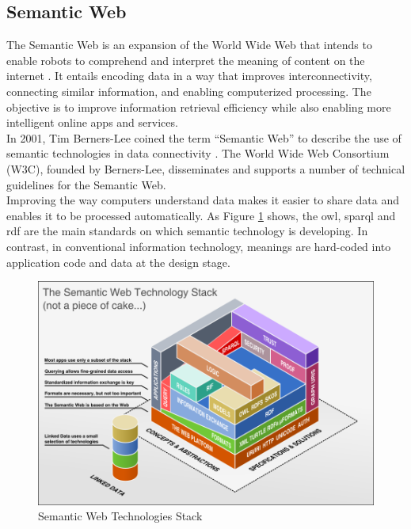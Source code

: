\subsection{Semantic Web\label{sec:semweb}}
The Semantic Web is an expansion of the World Wide Web that intends to enable robots to comprehend and interpret the meaning of content on the internet \cite{shadbolt2006semantic, berners2023semantic, kim2003semantic}. It entails encoding data in a way that improves interconnectivity, connecting similar information, and enabling computerized processing. The objective is to improve information retrieval efficiency while also enabling more intelligent online apps and services.\\

In 2001, Tim Berners-Lee coined the term “Semantic Web” to describe the use of semantic technologies in data connectivity \cite{berners2023semantic}. The World Wide Web Consortium (W3C), founded by Berners-Lee, disseminates and supports a number of technical guidelines for the Semantic Web.\\

Improving the way computers understand data makes it easier to share data and enables it to be processed automatically. As Figure \ref{fig:sem-web-stack} shows, the \acrfull{owl}, \acrfull{sparql} and \acrfull{rdf} are the main standards on which semantic technology is developing. In contrast, in conventional information technology, meanings are hard-coded into application code and data at the design stage. \\

\begin{figure}[ht]
    \centering
    \includegraphics[scale=0.6]{images/foundation-sem-web-tech-stack.png}
    \caption{\label{fig:sem-web-stack} Semantic Web Technologies Stack \cite{semWebStack} }
\end{figure}


